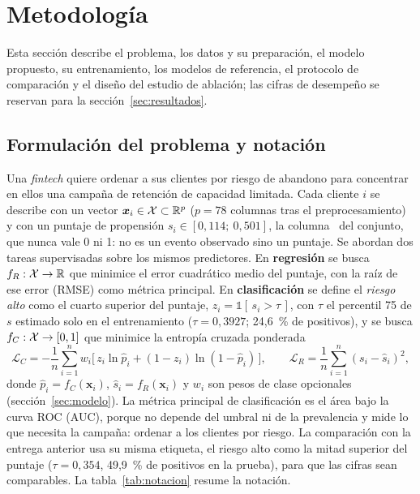 \section{Metodología}
\label{sec:metodologia}

Esta sección describe el problema, los datos y su preparación, el modelo propuesto, su entrenamiento, los
modelos de referencia, el protocolo de comparación y el diseño del estudio de ablación; las cifras de
desempeño se reservan para la sección~\ref{sec:resultados}.

\subsection{Formulación del problema y notación}
\label{sec:formulacion}

Una \emph{fintech} quiere ordenar a sus clientes por riesgo de abandono para concentrar en ellos una campaña
de retención de capacidad limitada. Cada cliente $i$ se describe con un vector $\bm{x}_i \in \mathcal{X} \subset \mathbb{R}^{p}$
($p = 78$ columnas tras el preprocesamiento) y con un puntaje de propensión $s_i \in [0{,}114;\ 0{,}501]$, la
columna \cp\ del conjunto, que nunca vale 0 ni 1: no es un evento observado sino un puntaje. Se abordan dos
tareas supervisadas sobre los mismos predictores. En \textbf{regresión} se busca $f_R: \mathcal{X} \to \mathbb{R}$ que
minimice el error cuadrático medio del puntaje, con la raíz de ese error (RMSE) como métrica principal. En
\textbf{clasificación} se define el \emph{riesgo alto} como el cuarto superior del puntaje,
$z_i = \mathbb{1}[\,s_i > \tau\,]$, con $\tau$ el percentil 75 de $s$ estimado solo en el entrenamiento
($\tau = 0{,}3927$; 24,6~\% de positivos), y se busca $f_C: \mathcal{X} \to [0, 1]$ que minimice la entropía cruzada
ponderada
\begin{equation}
  \mathcal{L}_C = -\frac{1}{n}\sum_{i=1}^{n} w_i \big[\, z_i \ln \hat{p}_i + (1 - z_i) \ln (1 - \hat{p}_i) \,\big],
  \qquad
  \mathcal{L}_R = \frac{1}{n}\sum_{i=1}^{n} (s_i - \hat{s}_i)^2,
  \label{eq:perdidas}
\end{equation}
donde $\hat{p}_i = f_C(\bm{x}_i)$, $\hat{s}_i = f_R(\bm{x}_i)$ y $w_i$ son pesos de clase opcionales
(sección~\ref{sec:modelo}). La métrica principal de clasificación es el área bajo la curva ROC (AUC), porque
no depende del umbral ni de la prevalencia y mide lo que necesita la campaña: ordenar a los clientes por
riesgo. La comparación con la entrega anterior usa su misma etiqueta, el riesgo alto como la mitad superior
del puntaje ($\tau = 0{,}354$, 49,9~\% de positivos en la prueba), para que las cifras sean comparables. La
tabla~\ref{tab:notacion} resume la notación.

